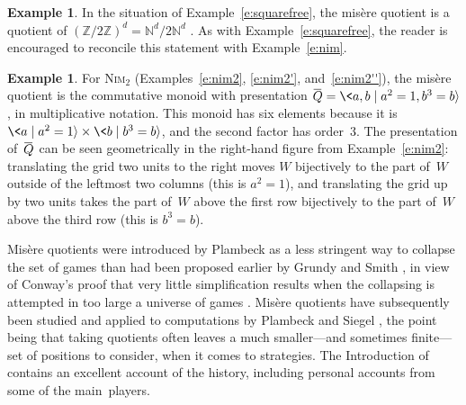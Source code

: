 \documentclass[12pt]{amsart}
\numberwithin{equation}{section}
\theoremstyle{definition}
\newtheorem{example}[thm]{Example}
\begin{document}
\begin{example}\label{e:squarefree'}
In the situation of Example~\ref{e:squarefree}, the mis\`ere quotient
is a quotient of $({\mathbb{Z}}/2{\mathbb{Z}})^d = {\mathbb{N}}^d/2{\mathbb{N}}^d$
\cite[Proposition~6.8]{latticeGames}.  As with
Example~\ref{e:squarefree}, the reader is encouraged to reconcile this
statement with Example~\ref{e:nim}.
\end{example}

\begin{example}\label{e:nim2quotient}
For {\textsc{Nim}}$_2$ (Examples~\ref{e:nim2}, \ref{e:nim2'},
and~\ref{e:nim2''}), the mis\`ere quotient is the commutative monoid
with presentation ${\hspace{.15ex}{{\overline{{\hspace{-.15ex}Q\hspace{-.25ex}}}}{}}\hspace{.25ex}} = \<a,b \mid a^2 =\nolinebreak 1, b^3
=\nolinebreak b{\rangle}$, in multiplicative notation.  This monoid has six
elements because it is $\<a \mid a^2 = 1{\rangle} \times \<b \mid b^3 = b{\rangle}$,
and the second factor has order~$3$.  The presentation of~${\hspace{.15ex}{{\overline{{\hspace{-.15ex}Q\hspace{-.25ex}}}}{}}\hspace{.25ex}}$ can be
seen geometrically in the right-hand figure from Example~\ref{e:nim2}:
translating the grid two units to the right moves $W$ bijectively to
the part of~$W$ outside of the leftmost two columns (this is $a^2 =
1$), and translating the grid up by two units takes the part of~$W$
above the first row bijectively to the part of~$W$ above the third row
(this is $b^3 = b$).
\end{example}

Mis\`ere quotients were introduced by Plambeck \cite{plambeck05} as a
less stringent way to collapse the set of games than had been proposed
earlier by Grundy and Smith \cite{grundy-smith}, in view of Conway's
proof that very little simplification results when the collapsing is
attempted in too large a universe of games \cite[Theorem~77]{ONAG}.
Mis\`ere quotients have subsequently been studied and applied to
computations by Plambeck and Siegel \cite{misereQuots, siegel07}, the
point being that taking quotients often leaves a much smaller---and
sometimes finite---set of positions to consider, when it comes to
strategies.  The Introduction of \cite{misereQuots} contains an
excellent account of the history, including personal accounts from
some of the main~players.
\end{document}
